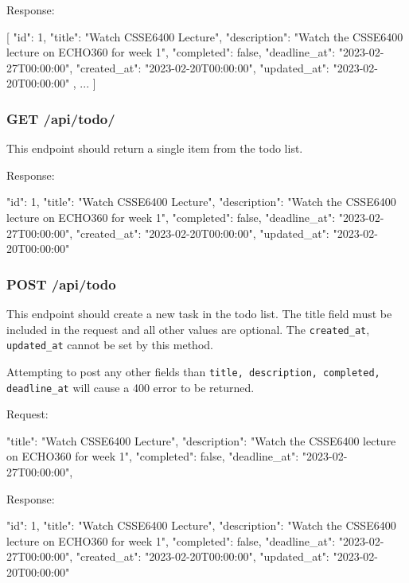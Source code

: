 \documentclass{csse4400}
\begin{document}
Response:
\begin{code}[language=json]{}
[
  {
    "id": 1,
    "title": "Watch CSSE6400 Lecture",
    "description": "Watch the CSSE6400 lecture on ECHO360 for week 1",
    "completed": false,
    "deadline_at": "2023-02-27T00:00:00",
    "created_at": "2023-02-20T00:00:00",
    "updated_at": "2023-02-20T00:00:00"
  },
  {
    ...
  }
]
\end{code}

\subsubsection{GET /api/todo/}
This endpoint should return a single item from the todo list.

Response:
\begin{code}[language=json]{}
{
  "id": 1,
  "title": "Watch CSSE6400 Lecture",
  "description": "Watch the CSSE6400 lecture on ECHO360 for week 1",
  "completed": false,
  "deadline_at": "2023-02-27T00:00:00",
  "created_at": "2023-02-20T00:00:00",
  "updated_at": "2023-02-20T00:00:00"
}
\end{code}

\subsubsection{POST /api/todo}
This endpoint should create a new task in the todo list. The title field must be included in the request and all other values are optional. The \texttt{created\_at}, \texttt{updated\_at} cannot be set by this method.

Attempting to post any other fields than \texttt{title, description, completed, deadline\_at} will cause a 400 error to be returned.

Request:
\begin{code}[language=json]{}
{
  "title": "Watch CSSE6400 Lecture",
  "description": "Watch the CSSE6400 lecture on ECHO360 for week 1",
  "completed": false,
  "deadline_at": "2023-02-27T00:00:00",
}
\end{code}

Response:
\begin{code}[language=json]{}
{
  "id": 1,
  "title": "Watch CSSE6400 Lecture",
  "description": "Watch the CSSE6400 lecture on ECHO360 for week 1",
  "completed": false,
  "deadline_at": "2023-02-27T00:00:00",
  "created_at": "2023-02-20T00:00:00",
  "updated_at": "2023-02-20T00:00:00"
}
\end{code}
\end{document}
